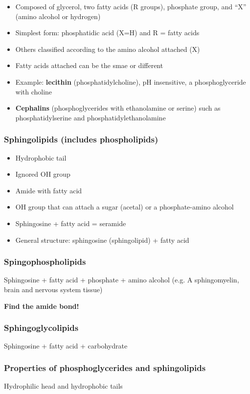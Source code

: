 \documentclass[letterpaper, 12pt]{article}
\begin{document}
\begin{itemize}
\item Composed of glycerol, two fatty acids (R groups), phosphate group, and ``X'' (amino alcohol or hydrogen)
\item Simplest form: phosphatidic acid (X=H) and R = fatty acids
\item Others classified according to the amino alcohol attached (X)
\item Fatty acids attached can be the smae or different
\item Example: \textbf{lecithin} (phosphatidylcholine), pH insensitive, a phosphoglyceride with choline
\item \textbf{Cephalins} (phosphoglycerides with ethanolamine or serine) such as phosphatidylserine and phosphatidylethanolamine
\end{itemize}

\subsubsection*{Sphingolipids (includes phospholipids)}

\begin{itemize}
\item Hydrophobic tail
\item Ignored OH group
\item Amide with fatty acid
\item OH group that can attach a sugar (acetal) or a phosphate-amino alcohol
\item Sphingosine + fatty acid = seramide
\item General structure: sphingosine (sphingolipid) + fatty acid
\end{itemize}

\subsubsection*{Spingophospholipids}
Sphingosine + fatty acid + phosphate + amino alcohol (e.g. A sphingomyelin, brain and nervous system tissue)

\textbf{Find the amide bond!}

\subsubsection*{Sphingoglycolipids}
Sphingosine + fatty acid + carbohydrate

\subsubsection*{Properties of phosphoglycerides and sphingolipids}
Hydrophilic head and hydrophobic tails
\end{document}
